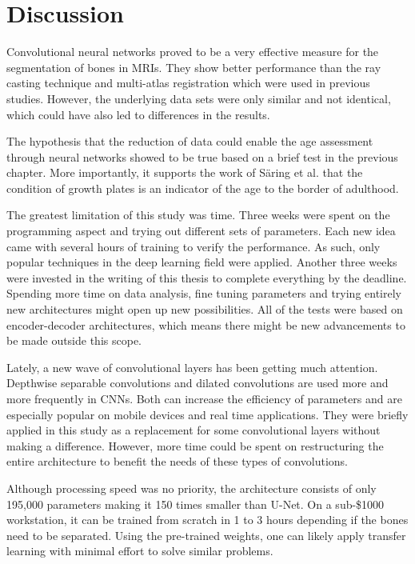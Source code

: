 \section{Discussion}

Convolutional neural networks proved to be a very effective measure for the segmentation of bones in MRIs. They show better performance than the ray casting technique and multi-atlas registration which were used in previous studies. However, the underlying data sets were only similar and not identical, which could have also led to differences in the results.

The hypothesis that the reduction of data could enable the age assessment through neural networks showed to be true based on a brief test in the previous chapter. More importantly, it supports the work of Säring et al. that the condition of growth plates is an indicator of the age to the border of adulthood.

The greatest limitation of this study was time. Three weeks were spent on the programming aspect and trying out different sets of parameters. Each new idea came with several hours of training to verify the performance. As such, only popular techniques in the deep learning field were applied. Another three weeks were invested in the writing of this thesis to complete everything by the deadline. Spending more time on data analysis, fine tuning parameters and trying entirely new architectures might open up new possibilities. All of the tests were based on encoder-decoder architectures, which means there might be new advancements to be made outside this scope.

Lately, a new wave of convolutional layers has been getting much attention. Depthwise separable convolutions and dilated convolutions are used more and more frequently in CNNs. Both can increase the efficiency of parameters and are especially popular on mobile devices and real time applications. They were briefly applied in this study as a replacement for some convolutional layers without making a difference. However, more time could be spent on restructuring the entire architecture to benefit the needs of these types of convolutions.

Although processing speed was no priority, the architecture consists of only 195,000 parameters making it 150 times smaller than U-Net. On a sub-\$1000 workstation, it can be trained from scratch in 1 to 3 hours depending if the bones need to be separated. Using the pre-trained weights, one can likely apply transfer learning with minimal effort to solve similar problems.

